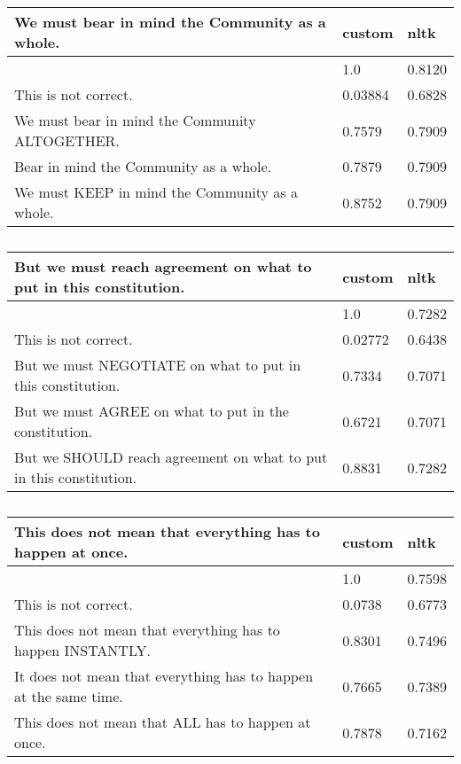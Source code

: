 \documentclass[a4paper]{article}
\begin{document}
\begin{table}
  \begin{tabular}{l l l}
    \toprule
    We must bear in mind the Community as a whole. & custom & nltk \\
    \midrule
                            & 1.0 & 0.8120 \\
    This is not correct. & 0.03884 & 0.6828 \\
    We must bear in mind the Community ALTOGETHER. & 0.7579 & 0.7909 \\
    Bear in mind the Community as a whole. & 0.7879 & 0.7909 \\
    We must KEEP in mind the Community as a whole. & 0.8752 & 0.7909 \\
    \bottomrule
  \end{tabular}
  \caption{}
\end{table}
    

\begin{table}
  \begin{tabular}{l l l}
    \toprule
    But we must reach agreement on what to put in this constitution. & custom & nltk \\
    \midrule
                                                                     & 1.0 & 0.7282\\
    This is not correct. & 0.02772 & 0.6438 \\
    But we must NEGOTIATE on what to put in this constitution. & 0.7334 & 0.7071 \\
    But we must AGREE on what to put in the constitution. & 0.6721 & 0.7071 \\
    But we SHOULD reach agreement on what to put in this constitution. & 0.8831 & 0.7282 \\
    \bottomrule
  \end{tabular}
  \caption{}
\end{table}

\begin{table}
  \begin{tabular}{l l l}
    \toprule
    This does not mean that everything has to happen at once. & custom & nltk \\
    \midrule
                                                              & 1.0 & 0.7598 \\
    This is not correct. & 0.0738 & 0.6773 \\
    This does not mean that everything has to happen INSTANTLY. & 0.8301 & 0.7496 \\
    It does not mean that everything has to happen at the same time. & 0.7665 & 0.7389 \\
    This does not mean that ALL has to happen at once. & 0.7878 & 0.7162 \\
    \bottomrule
  \end{tabular}
  \caption{}
\end{table}
\end{document}
